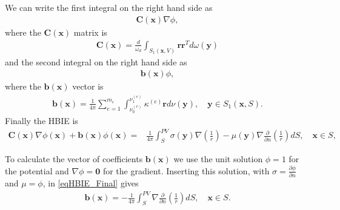 \documentclass[]{book}
\newcommand{\V}[1]{\boldsymbol{#1}}
\newcommand{\D}[2]{\frac{\partial #1}{\partial #2}}
\begin{document}
We can write the first integral on the right hand side as 
\begin{align}
\V{C}(\V{x}) \nabla \phi,
\end{align}
where the $\V{C}(\V{x})$ matrix is
\begin{align}
\V{C}(\V{x}) = \frac{d}{\omega_d} \int_{S_1(\V{x},V)} \V{r} \V{r}^T d\omega(\V{y})
\end{align}
and the second integral on the right hand side as 
\begin{align}
\V{b}(\V{x}) \phi,
\end{align}
where the $\V{b}(\V{x})$ vector is
\begin{align}
\V{b}(\V{x}) = \frac{1}{4 \pi} \sum_{e=1}^{m_e} \int_{\nu_0^{(e)}}^{\nu_1^{(e)}} \kappa^{(e)} \V{r} d\nu(\V{y}), \quad \V{y} \in S_1(\V{x},S).
\end{align}
Finally the HBIE is
\begin{align}
\V{C}(\V{x})\nabla \phi(\V{x}) + \V{b}(\V{x})\phi(\V{x})  = & \frac{1}{4 \pi} \int_{S}^{PV} \sigma (\V{y}) \nabla\left(\frac{1}{r} \right) - \mu(\V{y}) \nabla \frac{\partial }{\partial n} \left( \frac{1}{r}\right) dS, \quad \V{x} \in S,
\label{eqHBIE_Final}
\end{align}

To calculate the vector of coefficients $\V{b}(\V{x})$ we use the unit solution $\phi = 1$ for the potential and $\nabla \phi = \V{0}$ for the gradient. Inserting this solution, with $\sigma = \D{\phi}{n}$ and $\mu = \phi$, in \eqref{eqHBIE_Final} gives
\begin{align}
\V{b}(\V{x}) =- \frac{1}{4 \pi} \int_{S}^{PV} \nabla \frac{\partial }{\partial n} \left( \frac{1}{r}\right) dS, \quad \V{x} \in S.
\label{eqHBIE_CPV}
\end{align}
\end{document}
